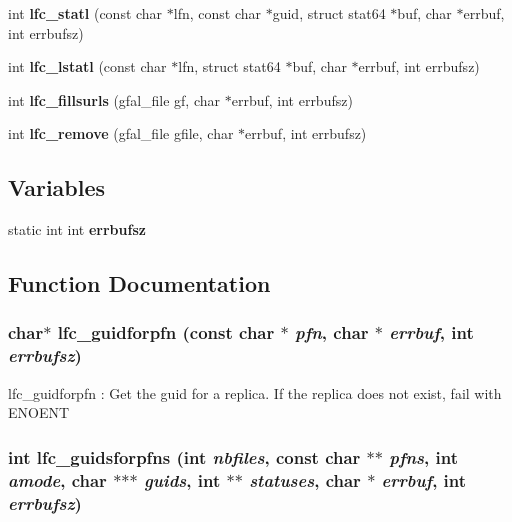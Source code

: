 \begin{CompactItemize}
\item 
int \textbf{lfc\_\-statl} (const char $\ast$lfn, const char $\ast$guid, struct stat64 $\ast$buf, char $\ast$errbuf, int errbufsz)\label{group__lowlevel_g3115c08a5c7ffb01087a192358a40ca1}

\item 
int \textbf{lfc\_\-lstatl} (const char $\ast$lfn, struct stat64 $\ast$buf, char $\ast$errbuf, int errbufsz)\label{group__lowlevel_g498672f9d3482822d3da75e23903cfdb}

\item 
int \textbf{lfc\_\-fillsurls} (gfal\_\-file gf, char $\ast$errbuf, int errbufsz)\label{group__lowlevel_g0b34fbad9eb051aa476eec5bea9e7692}

\item 
int \textbf{lfc\_\-remove} (gfal\_\-file gfile, char $\ast$errbuf, int errbufsz)\label{group__lowlevel_g1f63e86121210390d7f0d448bdd4d44f}

\end{CompactItemize}
\subsection*{Variables}
\begin{CompactItemize}
\item 
static int int \textbf{errbufsz}\label{group__lowlevel_g51ff886d2f9a537a943f4db41528d563}

\end{CompactItemize}


\subsection{Function Documentation}
\subsubsection{\setlength{\rightskip}{0pt plus 5cm}char$\ast$ lfc\_\-guidforpfn (const char $\ast$ {\em pfn}, char $\ast$ {\em errbuf}, int {\em errbufsz})}\label{group__lowlevel_g344113bab975bfeedfa4be33b2054745}


lfc\_\-guidforpfn : Get the guid for a replica. If the replica does not exist, fail with ENOENT 
\subsubsection{\setlength{\rightskip}{0pt plus 5cm}int lfc\_\-guidsforpfns (int {\em nbfiles}, const char $\ast$$\ast$ {\em pfns}, int {\em amode}, char $\ast$$\ast$$\ast$ {\em guids}, int $\ast$$\ast$ {\em statuses}, char $\ast$ {\em errbuf}, int {\em errbufsz})}\label{group__lowlevel_gf922973a476763abd5185fc13d2af9eb}


